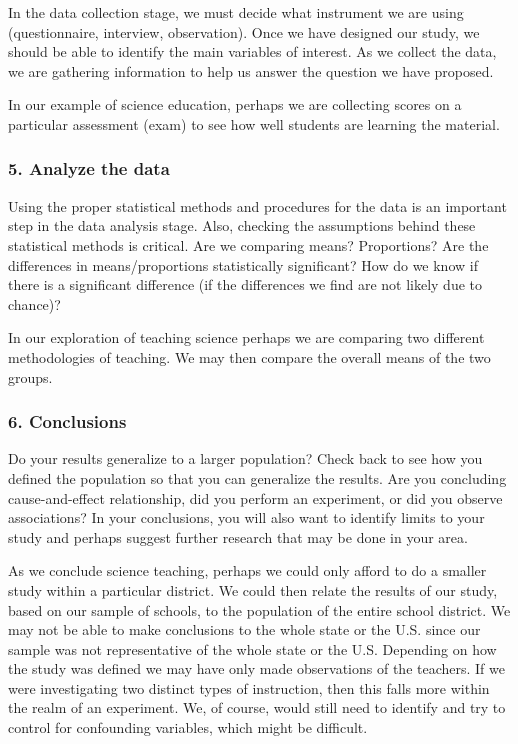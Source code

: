 \documentclass[11pt, chapterprefix=true]{scrbook}\usepackage[]{graphicx}\usepackage[]{color}
\begin{document}
In the data collection stage, we must decide what instrument we are using (questionnaire, interview, observation).  Once we have designed our study, we should be able to identify the main variables of interest.  As we collect the data, we are gathering information to help us answer the question we have proposed.

In our example of science education, perhaps we are collecting scores on a particular assessment (exam) to see how well students are learning the material.

\subsubsection{5. Analyze the data}

Using the proper statistical methods and procedures for the data is an important step in the data analysis stage.  Also, checking the assumptions behind these statistical methods is critical.  Are we comparing means?  Proportions?  Are the differences in means/proportions statistically significant?  How do we know if there is a significant difference (if the differences we find are not likely due  to chance)?

In our exploration of teaching science perhaps we are comparing two different methodologies of teaching.  We may then compare the overall means of the two groups.

\subsubsection{6. Conclusions}

Do your results generalize to a larger population?  Check back to see how you defined the population so that you can generalize the results.  Are you concluding cause-and-effect relationship, did you perform an experiment, or did you observe   associations?  In your conclusions, you will also want to identify limits to your study and perhaps suggest further research that may be done in your area.

As we conclude science teaching, perhaps we could only afford to do a smaller study within a particular district.  We could then relate the results of our study, based on our sample of schools, to the population of the entire school district.  We may not be able to make conclusions to the whole state or the U.S. since our sample was not representative of the whole state or the U.S.  Depending on how the study was defined we may have only made observations of the teachers.  If we were investigating two distinct types of instruction, then this falls more within the realm of an experiment.  We, of course, would still need to identify and try to control for confounding variables, which might be difficult.
\end{document}
